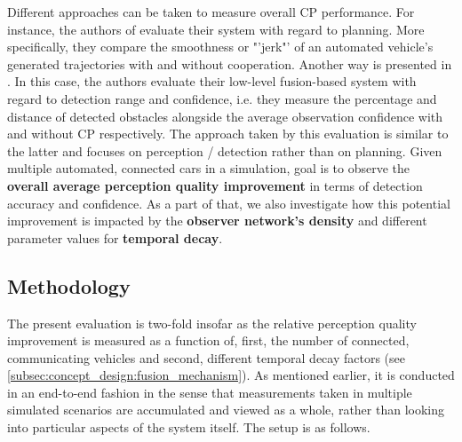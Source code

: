 Different approaches can be taken to measure overall CP performance. For instance, the authors of \cite{liu2013motion} evaluate their system with regard to planning. More specifically, they compare the smoothness or "'jerk"' of an automated vehicle's generated trajectories with and without cooperation. Another way is presented in \cite{Chen2019}. In this case, the authors evaluate their low-level fusion-based system with regard to detection range and confidence, i.e. they measure the percentage and distance of detected obstacles alongside the average observation confidence with and without CP respectively. The approach taken by this evaluation is similar to the latter and focuses on perception / detection rather than on planning. Given multiple automated, connected cars in a simulation, goal is to observe the \textbf{overall average perception quality improvement} in terms of detection accuracy and confidence. As a part of that, we also investigate how this potential improvement is impacted by the \textbf{observer network's density} and different parameter values for \textbf{temporal decay}.

\subsection{Methodology}
\label{subsec:evaluation:perception_evaluation:methodology}
The present evaluation is two-fold insofar as the relative perception quality improvement is measured as a function of, first, the number of connected, communicating vehicles and second, different temporal decay factors (see \cref{subsec:concept_design:fusion_mechanism}). As mentioned earlier, it is conducted in an end-to-end fashion in the sense that measurements taken in multiple simulated scenarios are accumulated and viewed as a whole, rather than looking into particular aspects of the system itself. The setup is as follows.
\par
\bigskip

